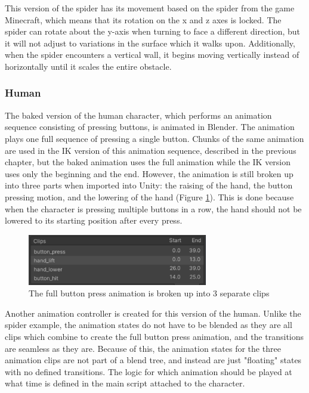 This version of the spider has its movement based on the spider from the game
Minecraft, which means that its rotation on the x and z axes is locked. The
spider can rotate about the y-axis when turning to face a different direction,
but it will not adjust to variations in the surface which it walks upon.
Additionally, when the spider encounters a vertical wall, it begins moving
vertically instead of horizontally until it scales the entire obstacle.

\subsubsection{Human}
The baked version of the human character, which performs an animation sequence
consisting of pressing buttons, is animated in Blender. The animation plays one
full sequence of pressing a single button. Chunks of the same animation are used
in the IK version of this animation sequence, described in the previous chapter,
but the baked animation uses the full animation while the IK version uses only
the beginning and the end. However, the animation is still broken up into three
parts when imported into Unity: the raising of the hand, the button pressing
motion, and the lowering of the hand (Figure \ref{fig:bp_clips}). This is done
because when the character is pressing multiple buttons in a row, the hand
should not be lowered to its starting position after every press.

\begin{figure}[h!]
    \centering
    \captionsetup{justification=centering}
    \includegraphics[width=0.7\textwidth]{grafika/bp_clips.png}
    \caption{The full button press animation is broken up into 3 separate clips}
    \label{fig:bp_clips}
\end{figure}

Another animation controller is created for this version of the human. Unlike
the spider example, the animation states do not have to be blended as they are
all clips which combine to create the full button press animation, and the
transitions are seamless as they are. Because of this, the animation states for
the three animation clips are not part of a blend tree, and instead are just
"floating" states with no defined transitions. The logic for which animation
should be played at what time is defined in the main script attached to the
character. 

